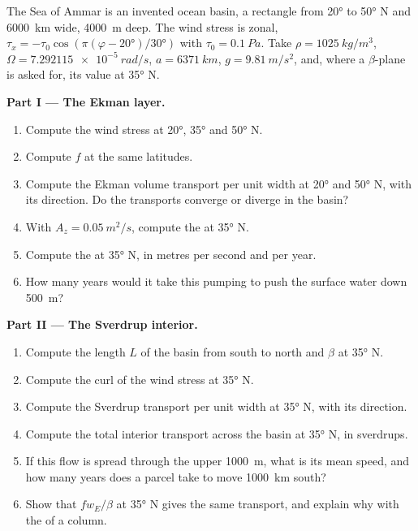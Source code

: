 \begin{problem}
\label{pb:b3:ocean-dynamics:1}
The Sea of Ammar is an invented ocean basin, a rectangle from \ang{20} to
\ang{50} N and \qty{6000}{km} wide, \qty{4000}{m} deep. The wind stress is
zonal, $\tau_x = -\tau_0\cos(\pi(\varphi - \ang{20})/\ang{30})$ with $\tau_0
= \qty{0.1}{Pa}$. Take $\rho = \qty{1025}{kg/m^3}$, $\Omega =
\qty{7.292115e-5}{rad/s}$, $a = \qty{6371}{km}$, $g = \qty{9.81}{m/s^2}$,
and, where a $\beta$-plane is asked for, its value at \ang{35} N.

\medskip\noindent\textbf{Part I --- The Ekman layer.}
\begin{enumerate}
\item Compute the wind stress at \ang{20}, \ang{35} and \ang{50} N.
\item Compute $f$ at the same latitudes.
\item Compute the Ekman volume transport per unit width at \ang{20} and
  \ang{50} N, with its direction. Do the transports converge or diverge in
  the basin?
\item With $A_z = \qty{0.05}{m^2/s}$, compute the  at \ang{35} N.
\item Compute the  at \ang{35} N, in metres per second and per
  year.
\item How many years would it take this pumping to push the surface water
  down \qty{500}{m}?
\end{enumerate}

\medskip\noindent\textbf{Part II --- The Sverdrup interior.}
\begin{enumerate}[resume]
\item Compute the length $L$ of the basin from south to north and $\beta$ at
  \ang{35} N.
\item Compute the curl of the wind stress at \ang{35} N.
\item Compute the Sverdrup transport per unit width at \ang{35} N, with its
  direction.
\item Compute the total interior transport across the basin at \ang{35} N,
  in sverdrups.
\item If this flow is spread through the upper \qty{1000}{m}, what is its
  mean speed, and how many years does a parcel take to move \qty{1000}{km}
  south?
\item Show that $fw_E/\beta$ at \ang{35} N gives the same transport, and
  explain why with the  of a column.
\end{enumerate}


\end{problem}

